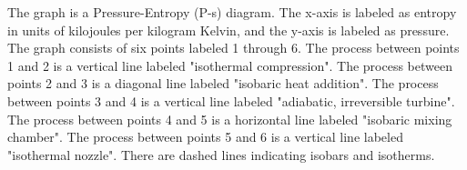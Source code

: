 The graph is a Pressure-Entropy (P-s) diagram. The x-axis is labeled as entropy in units of kilojoules per kilogram Kelvin, and the y-axis is labeled as pressure. The graph consists of six points labeled 1 through 6. The process between points 1 and 2 is a vertical line labeled "isothermal compression". The process between points 2 and 3 is a diagonal line labeled "isobaric heat addition". The process between points 3 and 4 is a vertical line labeled "adiabatic, irreversible turbine". The process between points 4 and 5 is a horizontal line labeled "isobaric mixing chamber". The process between points 5 and 6 is a vertical line labeled "isothermal nozzle". There are dashed lines indicating isobars and isotherms.